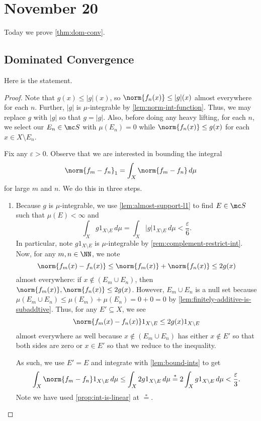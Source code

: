 \documentclass[../notes.tex]{subfiles}
\begin{document}
\section{November 20}

Today we prove \autoref{thm:dom-conv}.

\subsection{Dominated Convergence}
Here is the statement.
\domconvthm*
\begin{proof}
	Note that $g(x)\le|g|(x)$, so $\norm{f_n(x)}\le|g|(x)$ almost everywhere for each $n$. Further, $|g|$ is $\mu$-integrable by \autoref{lem:norm-int-function}. Thus, we may replace $g$ with $|g|$ so that $g=|g|$. Also, before doing any heavy lifting, for each $n$, we select our $E_n\in\mc S$ with $\mu(E_n)=0$ while $\norm{f_n(x)}\le g(x)$ for each $x\in X\setminus E_n$.

	Fix any $\varepsilon>0$. Observe that we are interested in bounding the integral
	\[\norm{f_m-f_n}_1=\int_X\norm{f_m-f_n}\,d\mu\]
	for large $m$ and $n$. We do this in three steps.
	\begin{enumerate}
		\item Because $g$ is $\mu$-integrable, we use \autoref{lem:almost-support-l1} to find $E\in\mc S$ such that $\mu(E)<\infty$ and
		\[\int_Xg1_{X\setminus E}\,d\mu=\int_X|g|1_{X\setminus E}\,d\mu<\frac\varepsilon6.\]
		In particular, note $g1_{X\setminus E}$ is $\mu$-integrable by \autoref{rem:complement-restrict-int}. Now, for any $m,n\in\NN$, we note
		\[\norm{f_m(x)-f_n(x)}\le\norm{f_m(x)}+\norm{f_n(x)}\le2g(x)\]
		almost everywhere: if $x\notin(E_m\cup E_n)$, then $\norm{f_m(x)},\norm{f_n(x)}\le2g(x)$. However, $E_m\cup E_n$ is a null set because $\mu(E_m\cup E_n)\le\mu(E_m)+\mu(E_n)=0+0=0$ by \autoref{lem:finitely-additive-is-subaddtive}. Thus, for any $E'\subseteq X$, we see
		\begin{equation}
			\norm{f_m(x)-f_n(x)}1_{X\setminus E}\le2g(x)1_{X\setminus E} \label{eq:restrict-ae-ineq}
		\end{equation}
		almost everywhere as well because $x\notin(E_m\cup E_n)$ has either $x\notin E'$ so that both sides are zero or $x\in E'$ so that we reduce to the inequality.
		
		As such, we use $E'=E$ and integrate with \autoref{lem:bound-ints} to get
		\[\int_X\norm{f_m-f_n}1_{X\setminus E}\,d\mu\le\int_X2g1_{X\setminus E}\,d\mu\stackrel*=2\int_Xg1_{X\setminus E}\,d\mu<\frac\varepsilon3.\]
		Note we have used \autoref{prop:int-is-linear} at $\stackrel*=$.


\end{enumerate}
\end{proof}
\end{document}
